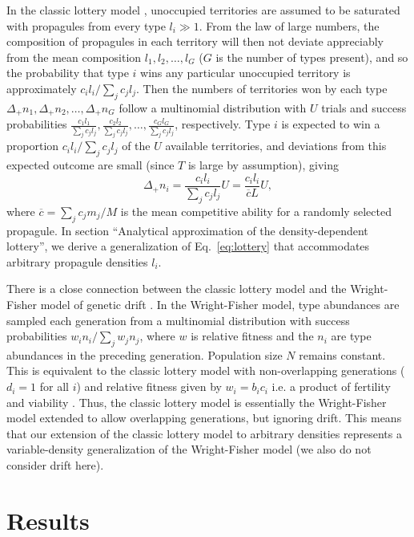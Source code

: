 \documentclass[12pt]{article}
\begin{document}
In the classic lottery model \citep{chesson_1981}, unoccupied territories are assumed to be saturated with propagules from every type $l_i\gg 1$. From the law of large numbers, the composition of propagules in each territory will then not deviate appreciably from the mean composition $l_1,l_2,\ldots,l_G$ ($G$ is the number of types present), and so the probability that type $i$ wins any particular unoccupied territory is approximately $c_i l_i/\sum_j c_j l_j$. Then the numbers of territories won by each type $\Delta_+ n_1,\Delta_+ n_2,\ldots,\Delta_+ n_G$ follow a multinomial distribution with $U$ trials and success probabilities $\frac{c_1 l_1}{\sum_j c_j l_j},\frac{c_2 l_2}{\sum_j c_j l_j},\ldots,\frac{c_G l_G}{\sum_j c_j l_j}$, respectively. Type $i$ is expected to win a proportion $c_i l_i/\sum_j c_j l_j$ of the $U$ available territories, and deviations from this expected outcome are small (since $T$ is large by assumption), giving 
\begin{equation}
\Delta_+ n_i=\frac{c_i l_i}{\sum_j c_j l_j}U=\frac{c_i l_i}{\overline{c}L}U, \label{eq:lottery}
\end{equation}
where $\overline{c}=\sum_j c_j m_j/M$ is the mean competitive ability for a randomly selected propagule. In section ``Analytical approximation of the density-dependent lottery'', we derive a generalization of Eq.~\eqref{eq:lottery} that accommodates arbitrary propagule densities $l_i$.
 
There is a close connection between the classic lottery model and the Wright-Fisher model of genetic drift \citep{svardal_2015}. In the Wright-Fisher model, type abundances are sampled each generation from a multinomial distribution with success probabilities $w_i n_i/\sum_j w_j n_j$, where $w$ is relative fitness and the $n_i$ are  type abundances in the preceding generation. Population size $N$ remains constant. This is equivalent to the classic lottery model with non-overlapping generations ($d_i=1$ for all $i$) and relative fitness given by $w_i=b_i c_i$ i.e. a product of fertility and viability \citep[pp. 185]{crow_1970}. Thus, the classic lottery model is essentially the Wright-Fisher model extended to allow overlapping generations, but ignoring drift. This means that our extension of the classic lottery model to arbitrary densities represents a variable-density generalization of the Wright-Fisher model (we also do not consider drift here).

\section*{Results}
\end{document}
